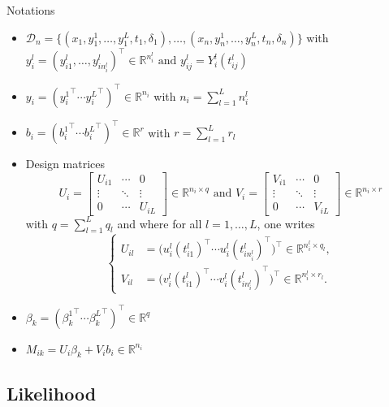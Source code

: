 \documentclass{beamer}
\newcommand{\R}{\mathbb R}
\newcommand{\cD}{\mathcal D}
\begin{document}
\begin{frame}{Notations}

\footnotesize
\begin{itemize}
  \item $\cD_n = \big\{ (x_1, y_1^1, \ldots, y_1^L, t_1, \delta_1), \ldots, (x_n, y_n^1, \ldots, y_n^L, t_n, \delta_n) \big\}$ with $y_i^l=(y_{i1}^l, \ldots, y_{in_i^l}^l)^\top \in \R^{n_i^l} \text{ and } y_{ij}^l=Y_i^l(t_{ij}^l)$
  \item $y_i = ({y_i^1}^\top \cdots {y_i^L}^\top)^\top \in \R^{n_i}$ with $n_i = \sum_{l=1}^L n_i^l$
  \item $b_i = ({b_i^1}^\top \cdots {b_i^L}^\top)^\top \in \R^r$ with $r = \sum_{l=1}^L r_l$
  \item Design matrices
  \[ U_i = 
\begin{bmatrix}
  U_{i1} & \cdots & 0\\
  \vdots &  \ddots & \vdots \\
  0 & \cdots & U_{iL}
\end{bmatrix} 
\in \R^{n_i \times q}
\text{ and }
V_i = 
\begin{bmatrix}
  V_{i1} & \cdots & 0\\
  \vdots &  \ddots & \vdots \\
  0 & \cdots & V_{iL}
\end{bmatrix}
\in \R^{n_i \times r}
\]
with $q = \sum_{l=1}^L q_l$ and where for all $l=1, \ldots, L$, one writes
\[
\left\{
    \begin{array}{ll}
        U_{il} &= \big(u_i^l(t_{i1}^l)^\top \cdots u_i^l(t_{in_i^l}^l)^\top\big)^\top \in \R^{n_i^l \times q_l},\\
        V_{il} &= \big(v_i^l(t_{i1}^l)^\top \cdots v_i^l(t_{in_i^l}^l)^\top\big)^\top \in \R^{n_i^l \times r_l}.
    \end{array}
\right.
\]
  \item $\beta_k = ({\beta_k^1}^\top \cdots {\beta_k^L}^\top)^\top \in \R^q$
  \item $M_{ik} = U_i\beta_k + V_ib_i \in \R^{n_i}$
\end{itemize}

\end{frame}

\subsection{Likelihood}
\end{document}

